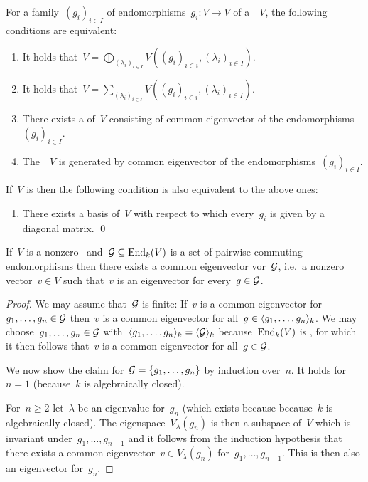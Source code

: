 

\begin{corollary}
  For a family~$(g_i)_{i \in I}$ of endomorphisms~$g_i \colon V \to V$ of a~{\kvs}~$V$, the following conditions are equivalent:
  \begin{enumerate}
    \item
      It holds that~$V = \bigoplus_{(\lambda_i)_{i \in I}} V( (g_i)_{i \in i}, (\lambda_i)_{i \in I} )$.
    \item
      It holds that~$V = \sum_{(\lambda_i)_{i \in I}} V( (g_i)_{i \in i}, (\lambda_i)_{i \in I} )$.
    \item
      There exists a  of~$V$ consisting of common eigenvector of the endomorphisms~$(g_i)_{i \in I}$.
    \item
      The~{\kvs}~$V$ is generated by common eigenvector of the endomorphisms~$(g_i)_{i \in I}$.
  \end{enumerate}
  If~$V$ is {\fd} then the following condition is also equivalent to the above ones:
  \begin{enumerate}[resume]
    \item
      There exists a basis of~$V$ with respect to which every~$g_i$ is given by a diagonal matrix.
    \qed
  \end{enumerate}
\end{corollary}

\begin{corollary}
  \label{existence of common eigenvector}
  If~$V$ is a {\fd} nonzero~{\kvs} and~$\mathcal{G} \subseteq \operatorname{End}_k(V)$ is a set of pairwise commuting endomorphisms then there exists a common eigenvector vor~$\mathcal{G}$, i.e.\ a nonzero vector~$v \in V$ such that~$v$ is an eigenvector for every~$g \in \mathcal{G}$.
\end{corollary}


\begin{proof}
  We may assume that~$\mathcal{G}$ is finite:
  If~$v$ is a common eigenvector for~$g_1, \dotsc, g_n \in \mathcal{G}$ then~$v$ is a common eigenvector for all~$g \in \langle g_1, \dotsc, g_n \rangle_k$.
  We may choose~$g_1, \dotsc, g_n \in \mathcal{G}$ with~$\langle g_1, \dotsc, g_n\rangle_k = \langle\mathcal{G}\rangle_k$ because~$\operatorname{End}_k(V)$ is {\fd}, for which it then follows that~$v$ is a common eigenvector for all~$g \in \mathcal{G}$.
  
  We now show the claim for~$\mathcal{G} = \{g_1, \dotsc, g_n\}$ by induction over~$n$.
  It holds for~$n = 1$ (because~$k$ is algebraically closed).
  

  For~$n \geq 2$ let~$\lambda$ be an eigenvalue for~$g_n$ (which exists because because~$k$ is algebraically closed).
  The eigenspace~$V_\lambda(g_n)$ is then a subspace of~$V$ which is invariant under~$g_1, \dotsc, g_{n-1}$ and it follows from the induction hypothesis that there exists a common eigenvector~$v \in V_\lambda(g_n)$ for~$g_1, \dotsc, g_{n-1}$.
  This is then also an eigenvector for~$g_n$.
\end{proof}


